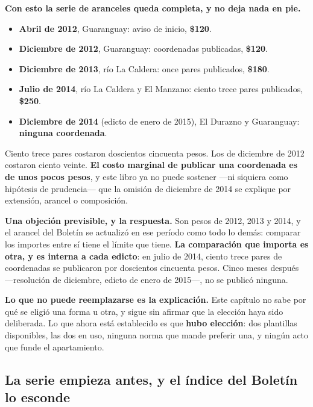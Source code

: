 \begin{cautela}
\textbf{Con esto la serie de aranceles queda completa, y no deja nada en pie.}

\begin{itemize}[leftmargin=*,itemsep=0.2em,topsep=0.3em]
\item \textbf{Abril de 2012}, Guaranguay: aviso de inicio, \textbf{\$120}.
\item \textbf{Diciembre de 2012}, Guaranguay: coordenadas publicadas, \textbf{\$120}.
\item \textbf{Diciembre de 2013}, río La Caldera: once pares publicados, \textbf{\$180}.
\item \textbf{Julio de 2014}, río La Caldera y El Manzano: ciento trece pares publicados,
      \textbf{\$250}.
\item \textbf{Diciembre de 2014} (edicto de enero de 2015), El Durazno y Guaranguay: \textbf{ninguna coordenada}.
\end{itemize}

Ciento trece pares costaron doscientos cincuenta pesos. Los de diciembre de 2012 costaron ciento veinte.
\textbf{El costo marginal de publicar una coordenada es de unos pocos pesos}, y este libro ya
no puede sostener ---ni siquiera como hipótesis de prudencia--- que la omisión de diciembre de
2014 se explique por extensión, arancel o composición.

\textbf{Una objeción previsible, y la respuesta.} Son pesos de 2012, 2013 y 2014, y el arancel
del Boletín se actualizó en ese período como todo lo demás: comparar los importes entre sí tiene
el límite que tiene. \textbf{La comparación que importa es otra, y es interna a cada edicto}:
en julio de 2014, ciento trece pares de coordenadas se publicaron por doscientos cincuenta
pesos. Cinco meses después ---resolución de diciembre, edicto de enero de 2015---, no se publicó
ninguna.

\textbf{Lo que no puede reemplazarse es la explicación.} Este capítulo no sabe por qué se
eligió una forma u otra, y sigue sin afirmar que la elección haya sido deliberada. Lo que
ahora está establecido es que \textbf{hubo elección}: dos plantillas disponibles, las dos en
uso, ninguna norma que mande preferir una, y ningún acto que funde el apartamiento.
\end{cautela}

\subsection*{La serie empieza antes, y el índice del Boletín lo esconde}

